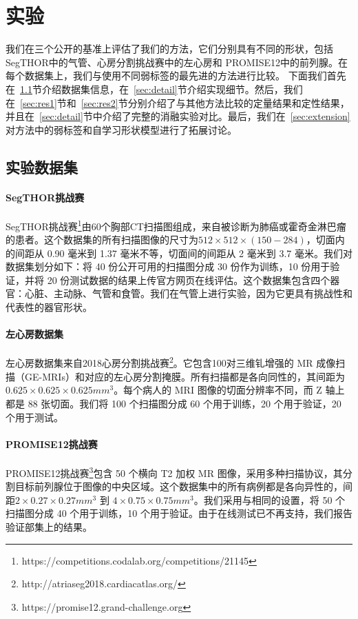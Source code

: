 \section{实验}
我们在三个公开的基准上评估了我们的方法，它们分别具有不同的形状，包括 SegTHOR\citep{trullo2019multiorgan}中的气管、心房分割挑战赛中的左心房和 PROMISE12\citep{Litjens2014EvaluationOP}中的前列腺。在每个数据集上，我们与使用不同弱标签的最先进的方法进行比较。
下面我们首先在~\ref{sec:dataset}节介绍数据集信息，在~\ref{sec:detail}节介绍实现细节。然后，我们在~\ref{sec:res1}节和~\ref{sec:res2}节分别介绍了与其他方法比较的定量结果和定性结果，并且在~\ref{sec:detail}节中介绍了完整的消融实验对比。最后，我们在~\ref{sec:extension}对方法中的弱标签和自学习形状模型进行了拓展讨论。

\subsection{实验数据集} \label{sec:dataset}

\paragraph{SegTHOR挑战赛}
SegTHOR挑战赛\footnote{https://competitions.codalab.org/competitions/21145}\citep{trullo2019multiorgan}由60个胸部CT扫描图组成，来自被诊断为肺癌或霍奇金淋巴瘤的患者。这个数据集的所有扫描图像的尺寸为$512\times512\times(150-284)$，切面内的间距从 0.90 毫米到 1.37 毫米不等，切面间的间距从 2 毫米到 3.7 毫米。我们对数据集划分如下：将 40 份公开可用的扫描图分成 30 份作为训练，10 份用于验证，并将 20 份测试数据的结果上传官方网页在线评估。这个数据集包含四个器官：心脏、主动脉、气管和食管。我们在气管上进行实验，因为它更具有挑战性和代表性的器官形状。

\paragraph{左心房数据集}
左心房数据集来自2018心房分割挑战赛\footnote{http://atriaseg2018.cardiacatlas.org/}。它包含100对三维钆增强的 MR 成像扫描（GE-MRIs）和对应的左心房分割掩膜。所有扫描都是各向同性的，其间距为 $0.625\times0.625\times0.625 mm^{3}$。每个病人的 MRI 图像的切面分辨率不同，而 Z 轴上都是 88 张切面。我们将 100 个扫描图分成 60 个用于训练，20 个用于验证，20 个用于测试。

\paragraph{PROMISE12挑战赛}
PROMISE12挑战赛\footnote{https://promise12.grand-challenge.org}\citep{Litjens2014EvaluationOP}包含 50 个横向 T2 加权 MR 图像，采用多种扫描协议，其分割目标前列腺位于图像的中央区域。这个数据集中的所有病例都是各向异性的，间距$2\times0.27\times0.27 mm^{3}$ 到 $4\times0.75\times0.75 mm^{3}$。我们采用与\citet{kervadec2020bounding}相同的设置，将 50 个扫描图分成 40 个用于训练，10 个用于验证。由于在线测试已不再支持，我们报告验证部集上的结果。

